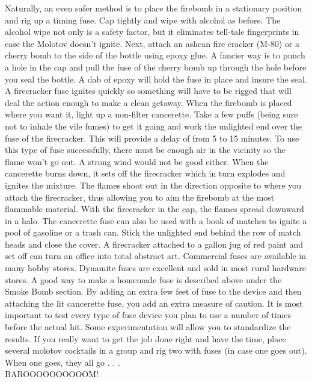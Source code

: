 \documentclass[11pt,twoside,a4paper]{book}
\begin{document}
Naturally, an even safer method is to place the firebomb in a stationary position and rig up a timing fuse. Cap tightly and wipe with alcohol as before. The alcohol wipe not only is a safety factor, but it eliminates tell-tale fingerprints in case the Molotov doesn't ignite. Next, attach an ashcan fire cracker (M-80) or a cherry bomb to the side of the bottle using epoxy glue. A fancier way is to punch a hole in the cap and pull the fuse of the cherry bomb up through the hole before you seal the bottle. A dab of epoxy will hold the fuse in place and insure the seal. A firecracker fuse ignites quickly so something will have to be rigged that will deal the action enough to make a clean getaway. When the firebomb is placed where you want it, light up a non-filter cancerette. Take a few puffs (being sure not to inhale the vile fumes) to get it going and work the unlighted end over the fuse of the firecracker. This will provide a delay of from 5 to 15 minutes. To use this type of fuse successfully, there must be enough air in the vicinity so the flame won't go out. A strong wind would not be good either. When the cancerette burns down, it sets off the firecracker which in turn explodes and ignites the mixture. The flames shoot out in the direction opposite to where you attach the firecracker, thus allowing you to aim the firebomb at the most flammable material. With the firecracker in the cap, the flames spread downward in a halo. The cancerette fuse can also be used with a book of matches to ignite a pool of gasoline or a trash can. Stick the unlighted end behind the row of match heads and close the cover. A firecracker attached to a gallon jug of red paint and set off can turn an office into total abstract art. Commercial fuses are available in many hobby stores. Dynamite fuses are excellent and sold in most rural hardware stores. A good way to make a homemade fuse is described above under the Smoke Bomb section. By adding an extra few feet of fuse to the device and then attaching the lit cancerette fuse, you add an extra measure of caution. It is most important to test every type of fuse device you plan to use a number of times before the actual hit. Some experimentation will allow you to standardize the results. If you really want to get the job done right and have the time, place several molotov cocktails in a group and rig two with fuses (in case one goes out). When one goes, they all go . . .~\\

BAROOOOOOOOOOM!~\\
\end{document}
